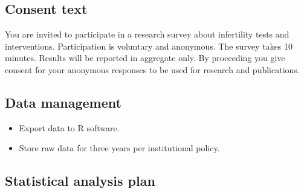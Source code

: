 \documentclass[
  letterpaper,
  DIV=11,
  numbers=noendperiod]{scrartcl}
\begin{document}
\subsection{Consent text}\label{consent-text}

You are invited to participate in a research survey about infertility
tests and interventions. Participation is voluntary and anonymous. The
survey takes 10 minutes. Results will be reported in aggregate only. By
proceeding you give consent for your anonymous responses to be used for
research and publications.

\subsection{Data management}\label{data-management}

\begin{itemize}
\item
  Export data to R software.
\item
  Store raw data for three years per institutional policy.
\end{itemize}

\subsection{Statistical analysis plan}\label{statistical-analysis-plan}
\end{document}
